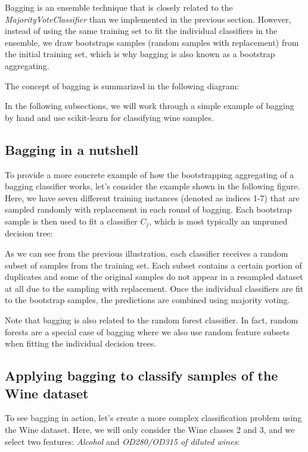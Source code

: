 \documentclass[11pt]{article}
\begin{document}
    Bagging is an ensemble technique that is closely related to the
\emph{MajorityVoteClassifier} than we implemented in the previous
section. However, instead of using the same training set to fit the
individual classifiers in the ensemble, we draw bootstraps samples
(random samples with replacement) from the initial training set, which
is why bagging is also known as a bootstrap aggregating.

The concept of bagging is summarized in the following diagram:

In the following subsections, we will work through a simple example of
bagging by hand and use scikit-learn for classifying wine samples.

    \subsection{Bagging in a nutshell}\label{bagging-in-a-nutshell}

    To provide a more concrete example of how the bootstrapping aggregating
of a bagging classifier works, let's consider the example shown in the
following figure. Here, we have seven different training instances
(denoted as indices 1-7) that are sampled randomly with replacement in
each round of bagging. Each bootstrap sample is then used to fit a
classifier \(C_j\), which is most typically an unpruned decision tree:

As we can see from the previous illustration, each classifier receives a
random subset of samples from the training set. Each subset contains a
certain portion of duplicates and some of the original samples do not
appear in a resampled dataset at all due to the sampling with
replacement. Once the individual classifiers are fit to the bootstrap
samples, the predictions are combined using majority voting.

Note that bagging is also related to the random forest classifier. In
fact, random forests are a special case of bagging where we also use
random feature subsets when fitting the individual decision trees.

    \subsection{Applying bagging to classify samples of the Wine
dataset}\label{applying-bagging-to-classify-samples-of-the-wine-dataset}

    To see bagging in action, let's create a more complex classification
problem using the Wine dataset. Here, we will only consider the Wine
classes 2 and 3, and we select two features: \emph{Alcohol} and
\emph{OD280/OD315 of diluted wines}:
\end{document}
